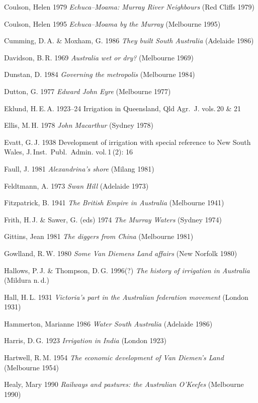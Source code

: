 Coulson, Helen 1979 \textit{Echuca--Moama: Murray River Neighbours}
(Red Cliffs 1979)

Coulson, Helen 1995 \textit{Echuca--Moama by the Murray} (Melbourne
1995)

Cumming, D.\,A. \& Moxham, G. 1986 \textit{They built South Australia}
(Adelaide 1986)

Davidson, B.\,R. 1969 \textit{Australia wet or dry?} (Melbourne 1969)

Dunstan, D. 1984 \textit{Governing the metropolis} (Melbourne 1984)

Dutton, G. 1977 \textit{Edward John Eyre} (Melbourne 1977)

Eklund, H.\,E.\,A. 1923--24 Irrigation in Queensland, Qld Agr.\
J. vols.\,20 \& 21

Ellis, M.\,H. 1978 \textit{John Macarthur} (Sydney 1978)

Evatt, G.\,J. 1938 Development of irrigation with special reference to
New South Wales, J.\,Inst.\ Publ.\ Admin. vol.\,1\,(2): 16

Faull, J. 1981 \textit{Alexandrina's shore} (Milang 1981)

Feldtmann, A. 1973 \textit{Swan Hill} (Adelaide 1973)

Fitzpatrick, B. 1941 \textit{The British Empire in Australia}
(Melbourne 1941)

Frith, H.\,J. \& Sawer, G. (eds) 1974 \textit{The Murray Waters}
(Sydney 1974)

Gittins, Jean 1981 \textit{The diggers from China} (Melbourne 1981)

Gowlland, R.\,W. 1980 \textit{Some Van Diemens Land affairs} (New
Norfolk 1980)

Hallows, P.\,J. \& Thompson, D.\,G.  1996(?) \textit{The history of
irrigation in Australia} (Mildura n.\,d.)

Hall, H.\,L.  1931 \textit{Victoria's part in the Australian
federation movement} (London 1931)

Hammerton, Marianne 1986 \textit{Water South Australia} (Adelaide
1986)

Harris, D.\,G. 1923 \textit{Irrigation in India} (London 1923)

Hartwell, R.\,M. 1954 \textit{The economic development of Van Diemen's
Land} (Melbourne 1954)

Healy, Mary 1990 \textit{Railways and pastures: the Australian
O'Keefes} (Melbourne 1990)

